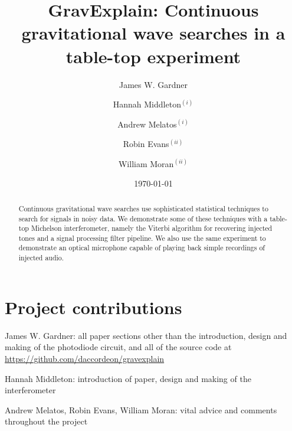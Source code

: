 \documentclass[prb,preprint]{revtex4-1}
\begin{document}
\section*{Project contributions}
James W. Gardner: all paper sections other than the introduction, design and making of the photodiode circuit, and all of the source code at \url{https://github.com/daccordeon/gravexplain}

Hannah Middleton: introduction of paper, design and making of the interferometer

Andrew Melatos, Robin Evans, William Moran: vital advice and comments throughout the project

\newpage

\title{GravExplain: Continuous gravitational wave searches in a table-top experiment}

\author{James W. Gardner}

\author{Hannah Middleton$^{(i)}$}
\author{Andrew Melatos$^{(i)}$}
\author{Robin Evans$^{(ii)}$}
\author{William Moran$^{(ii)}$}

\date{\today}

\begin{abstract}
Continuous gravitational wave searches use sophisticated statistical techniques to search for signals in noisy data. We demonstrate some of these techniques with a table-top Michelson interferometer, namely the Viterbi algorithm for recovering injected tones and a signal processing filter pipeline. We also use the same experiment to demonstrate an optical microphone capable of playing back simple recordings of injected audio.
 
\end{abstract}

\maketitle
\end{document}
